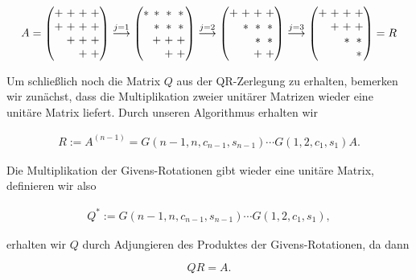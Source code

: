 \documentclass{article}
\theoremstyle{plain}
\begin{document}
\begin{align*}
\setlength\arraycolsep{1.5pt}
	A
	=
	\begin{pmatrix}
		+ & + & + & + \\
		+ & + & + & + \\
		& + & + & + \\
		& & +& + \\
	\end{pmatrix}
	\stackrel{j=1}{\longrightarrow}
	\begin{pmatrix}
		* & * & * & * \\
		 & * & * & * \\
		& + & + & + \\
		& & + &+ \\
	\end{pmatrix}
	\stackrel{j=2}{\longrightarrow}
	\begin{pmatrix}
		+ & + & + & + \\
		 & * & * & * \\
		&  & * & * \\
		& & +& + \\
	\end{pmatrix}
	\stackrel{j=3}{\longrightarrow}
	\begin{pmatrix}
		+ & + & + & + \\
		 & + & + & + \\
		&  & * & * \\
		& & & * \\
	\end{pmatrix}
	= R
\end{align*}

Um schließlich noch die Matrix $Q$ aus der QR-Zerlegung zu erhalten, bemerken wir zunächst, dass die Multiplikation zweier unitärer Matrizen wieder eine unitäre Matrix liefert. Durch unseren Algorithmus erhalten wir

\begin{align*}
R := A^{(n-1)} = G(n-1,n,c_{n-1},s_{n-1})\cdots G(1,2, c_1, s_1) A.
\end{align*}

Die Multiplikation der Givens-Rotationen gibt wieder eine unitäre Matrix, definieren wir also

\begin{align}
Q^* := G(n-1,n,c_{n-1},s_{n-1})\cdots G(1,2, c_1, s_1),
\label{Q_givens}
\end{align}

erhalten wir $Q$ durch Adjungieren des Produktes der Givens-Rotationen, da dann

$$
QR = A.
$$
\end{document}
